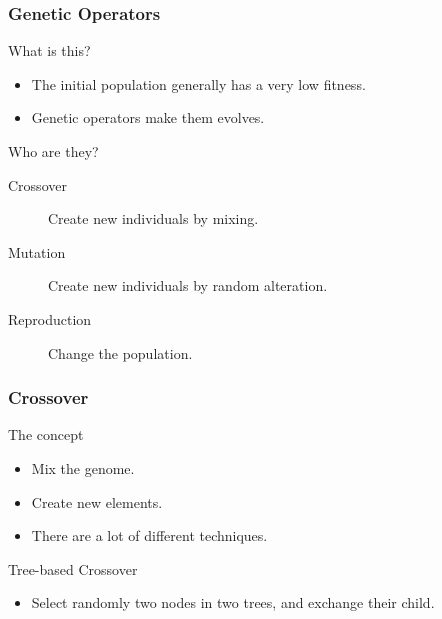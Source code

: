 \begin{frame}
  \frametitle{Genetic Operators}
  \begin{block}{What is this?}
    \begin{itemize}
    \item The initial population generally has a very low fitness.
    \item Genetic operators make them evolves.
    \end{itemize}
  \end{block}

  \begin{block}{Who are they?}
    \begin{description}
    \item[Crossover] Create new individuals by mixing.
    \item[Mutation] Create new individuals by random alteration.
    \item[Reproduction] Change the population.
    \end{description}
  \end{block}

\end{frame}

\begin{frame}
  \frametitle{Crossover}
  \begin{block}{The concept}
    \begin{itemize}
    \item Mix the genome.
    \item Create new elements.
    \item There are a lot of different techniques.
    \end{itemize}
  \end{block}

  \begin{block}{Tree-based Crossover}
    \begin{itemize}
    \item Select randomly two nodes in two trees, and exchange their
      child.
    \end{itemize}
  \end{block}
\end{frame}


